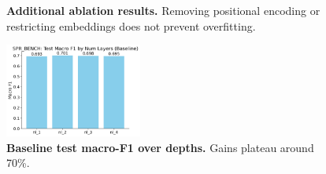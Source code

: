 \documentclass{article} %
\begin{document}
\begin{figure}[h]
\centering
{}
\caption{\textbf{Additional ablation results.} Removing positional encoding or restricting embeddings does not prevent overfitting.}
\label{fig:app_ablation_all}
\end{figure}

\begin{figure}[h]
\centering
\includegraphics[width=0.4\textwidth]{Baseline_TestF1_Bar.png}
\caption{\textbf{Baseline test macro-F1 over depths.} Gains plateau around 70\%.}
\label{fig:baseline_testf1_bar}
\end{figure}

\vfill
\end{document}
